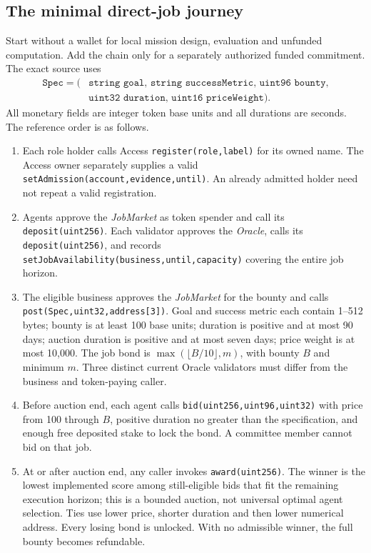 \documentclass[11pt,letterpaper]{article}
\begin{document}
\subsection{The minimal direct-job journey}
Start without a wallet for local mission design, evaluation and unfunded computation. Add the chain only for a separately authorized funded commitment. The exact source uses
\[
\begin{aligned}\texttt{Spec}=(&\texttt{string goal, string successMetric, uint96 bounty},\\ &\texttt{uint32 duration, uint16 priceWeight}).\end{aligned}
\]
All monetary fields are integer token base units and all durations are seconds. The reference order is as follows.

\begin{enumerate}
\item Each role holder calls Access \texttt{register(\allowbreak{}role,\allowbreak{}label)} for its owned name. The Access owner separately supplies a valid \texttt{setAdmission(\allowbreak{}account,\allowbreak{}evidence,\allowbreak{}until)}. An already admitted holder need not repeat a valid registration.
\item Agents approve the \emph{JobMarket} as token spender and call its \texttt{deposit(\allowbreak{}uint256)}. Each validator approves the \emph{Oracle}, calls its \texttt{deposit(\allowbreak{}uint256)}, and records \texttt{setJobAvailability(\allowbreak{}business,\allowbreak{}until,\allowbreak{}capacity)} covering the entire job horizon.
\item The eligible business approves the \emph{JobMarket} for the bounty and calls \texttt{post(\allowbreak{}Spec,\allowbreak{}uint32,\allowbreak{}address[\allowbreak{}3])}. Goal and success metric each contain 1--512 bytes; bounty is at least 100 base units; duration is positive and at most 90 days; auction duration is positive and at most seven days; price weight is at most 10,000. The job bond is \(\max(\lfloor B/10\rfloor,m)\), with bounty \(B\) and minimum \(m\). Three distinct current Oracle validators must differ from the business and token-paying caller.
\item Before auction end, each agent calls \texttt{bid(\allowbreak{}uint256,\allowbreak{}uint96,\allowbreak{}uint32)} with price from 100 through \(B\), positive duration no greater than the specification, and enough free deposited stake to lock the bond. A committee member cannot bid on that job.
\item At or after auction end, any caller invokes \texttt{award(\allowbreak{}uint256)}. The winner is the lowest implemented score among still-eligible bids that fit the remaining execution horizon; this is a bounded auction, not universal optimal agent selection. Ties use lower price, shorter duration and then lower numerical address. Every losing bond is unlocked. With no admissible winner, the full bounty becomes refundable.

\end{enumerate}
\end{document}
